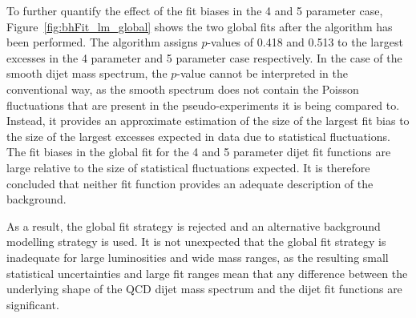 To further quantify the effect of the fit biases in the 4 and 5 parameter case,
Figure~\ref{fig:bhFit_lm_global} shows the two global fits after the \bh{} algorithm has been performed.
The \bh{} algorithm assigns \mbox{$p$-values} of 0.418 and 0.513 to the largest excesses in the 4 parameter and 5 parameter case respectively.
In the case of the smooth dijet mass spectrum, the \bh{} \mbox{$p$-value} cannot be interpreted in the conventional way,
as the smooth spectrum does not contain the Poisson fluctuations that are present in the pseudo-experiments it is being compared to.
Instead, it provides an approximate estimation of the size of the largest fit bias to the size of the largest excesses expected in data due to statistical fluctuations.
The fit biases in the global fit for the 4 and 5 parameter dijet fit functions are large relative to the size of statistical fluctuations expected.
It is therefore concluded that neither fit function provides an adequate description of the background.

\newpage
As a result, the global fit strategy is rejected and an alternative background modelling strategy is used.
It is not unexpected that the global fit strategy is inadequate for large luminosities and wide mass ranges,
as the resulting small statistical uncertainties and large fit ranges mean that any
difference between the underlying shape of the QCD dijet mass spectrum
and the dijet fit functions are significant.

